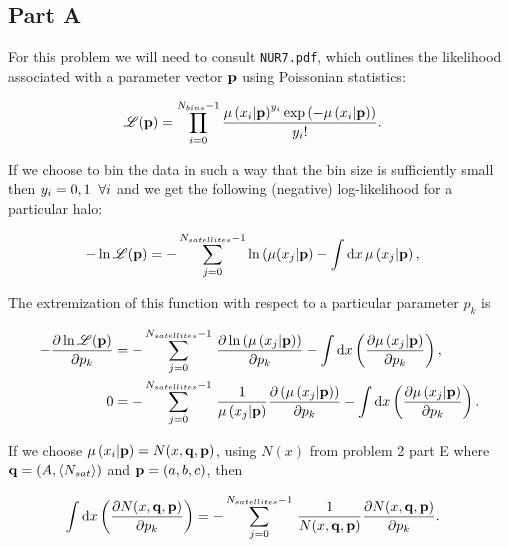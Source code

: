 \subsection{Part A}

For this problem we will need to consult \texttt{NUR7.pdf}, which outlines the likelihood associated with a parameter vector $\mathbf{p}$ using Poissonian statistics:

\begin{align}
\mathcal{L}(\mathbf{p}) &= \prod_{i=0}^{N_{bins}-1} {\mu\left(x_{i}|\mathbf{p}\right)^{y_{i}} \exp\left(-\mu\left(x_{i}|\mathbf{p}\right)\right) \over y_{i}!}.
\end{align}

If we choose to bin the data in such a way that the bin size is sufficiently small then $y_{i} = 0, 1 \hspace{2mm} \forall i$ and we get the following (negative) log-likelihood for a particular halo:

\begin{align}
-\ln \mathcal{L}(\mathbf{p}) &= -\sum_{j=0}^{N_{satellites} - 1} \ln \left(\mu(x_{j}|\mathbf{p}\right) - \int {\rm d} x \, \mu\left(x_{j}|\mathbf{p}\right),
\end{align}

The extremization of this function with respect to a particular parameter $p_{k}$ is

\begin{align}
-{\partial \ln \mathcal{L}(\mathbf{p}) \over \partial p_{k}} &= -\sum_{j=0}^{N_{satellites} - 1} \, {\partial \ln \left(\mu\left(x_{j}|\mathbf{p}\right)\right) \over \partial p_{k}} - \int {\rm d} x \left( {\partial \mu\left(x_{j}|\mathbf{p} \right) \over \partial p_{k}}\right), \\
0 &= -\sum_{j=0}^{N_{satellites} - 1} \, {1 \over \mu\left(x_{j}|\mathbf{p}\right)}{\partial \left(\mu\left(x_{j}|\mathbf{p}\right)\right) \over \partial p_{k}} - \int {\rm d} x \left( {\partial \mu\left(x_{j}|\mathbf{p}\right) \over \partial p_{k}}\right).
\end{align}

If we choose $\mu\left(x_{i}|\mathbf{p}\right) = N(x, \mathbf{q}, \mathbf{p})$, using $N(x)$ from problem 2 part E where $\mathbf{q} = (A, \langle N_{sat} \rangle)$ and $\mathbf{p} = (a,b,c)$, then

\begin{align}
\label{usingderivs} \int {\rm d} x \left( {\partial N(x, \mathbf{q}, \mathbf{p}) \over \partial p_{k}}\right) &= -\sum_{j=0}^{N_{satellites} - 1} \, {1 \over N(x, \mathbf{q}, \mathbf{p})}{\partial N(x, \mathbf{q}, \mathbf{p}) \over \partial p_{k}}.
\end{align}

